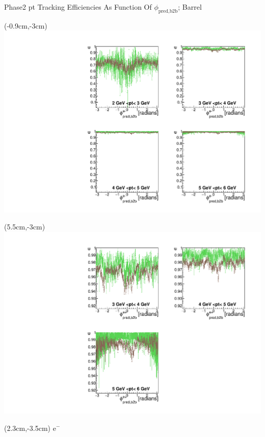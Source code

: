 \documentclass[8pt]{beamer}
\begin{document}
\begin{frame}{Phase2 pt Tracking Efficiencies As Function Of $\phi_{\textrm{pred,b2b}}$; Barrel}
	
	
	\begin{textblock*}{6.5cm}(-0.9cm,-3cm)
		\includegraphics[width=\textwidth]{VPlots/P2/xPtMPhiemBarrel}
	\end{textblock*}
	
	\begin{textblock*}{6.5cm}(5.5cm,-3cm)
		\includegraphics[width=\textwidth]{VPlots/P2/xPtMPhiepBarrel}
	\end{textblock*}
	
	
	\begin{textblock*}{2cm}(2.3cm,-3.5cm)
		$\textrm{e}^-$
	\end{textblock*}
	

\end{frame}
\end{document}
